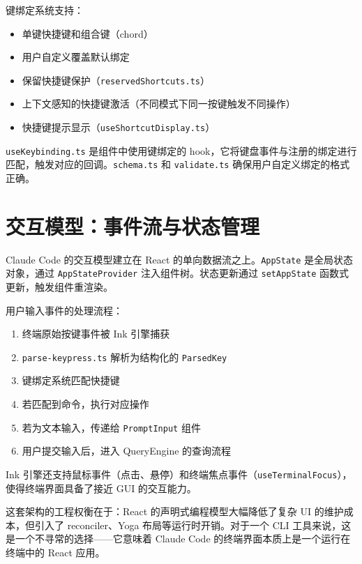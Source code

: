 键绑定系统支持：

\begin{itemize}
  \item 单键快捷键和组合键（chord）
  \item 用户自定义覆盖默认绑定
  \item 保留快捷键保护（\texttt{reservedShortcuts.ts}）
  \item 上下文感知的快捷键激活（不同模式下同一按键触发不同操作）
  \item 快捷键提示显示（\texttt{useShortcutDisplay.ts}）
\end{itemize}

\texttt{useKeybinding.ts} 是组件中使用键绑定的 hook，它将键盘事件与注册的绑定进行匹配，触发对应的回调。\texttt{schema.ts} 和 \texttt{validate.ts} 确保用户自定义绑定的格式正确。

\section{交互模型：事件流与状态管理}

Claude Code 的交互模型建立在 React 的单向数据流之上。\texttt{AppState} 是全局状态对象，通过 \texttt{AppStateProvider} 注入组件树。状态更新通过 \texttt{setAppState} 函数式更新，触发组件重渲染。

用户输入事件的处理流程：

\begin{enumerate}
  \item 终端原始按键事件被 Ink 引擎捕获
  \item \texttt{parse-keypress.ts} 解析为结构化的 \texttt{ParsedKey}
  \item 键绑定系统匹配快捷键
  \item 若匹配到命令，执行对应操作
  \item 若为文本输入，传递给 \texttt{PromptInput} 组件
  \item 用户提交输入后，进入 QueryEngine 的查询流程
\end{enumerate}

Ink 引擎还支持鼠标事件（点击、悬停）和终端焦点事件（\texttt{useTerminalFocus}），使得终端界面具备了接近 GUI 的交互能力。

这套架构的工程权衡在于：React 的声明式编程模型大幅降低了复杂 UI 的维护成本，但引入了 reconciler、Yoga 布局等运行时开销。对于一个 CLI 工具来说，这是一个不寻常的选择——它意味着 Claude Code 的终端界面本质上是一个运行在终端中的 React 应用。

